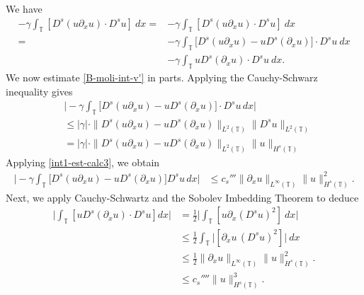\documentclass[12pt,reqno]{amsart}
\newcommand{\p}{\partial}
\newcommand{\ci}{\mathbb{T}}
\theoremstyle{plain}  %
\theoremstyle{definition}
\begin{document}
\begin{appendices}
	We have
	\begin{equation} 
	\begin{split}
		\label{B-moli-int-v'}
		-  \gamma \int_{\ci} \left [D^s (u \p_x u) \cdot D^s
		u \right ] \ dx
		= &- \gamma  \int_\ci
		\left [ D^s(u \partial_x u) \cdot   D^s u \right ] \ dx
		\\
		=& - \gamma \int_\ci
		\big[ 
		D^s(u\p_x u)  -  u D^s (\p_xu)
		\big] \cdot
		D^s u   \ dx
		\\
		&
		- \gamma \int_\ci
		u D^s (\p_xu) \cdot
		D^su \ dx.
	\end{split}
\end{equation}
%
%
%
We now estimate \eqref{B-moli-int-v'} in parts. Applying the Cauchy-Schwarz inequality gives
%
\begin{equation*} 
	\begin{split}
		& \Big|
		- \gamma \int_\ci
		\big[ 
		D^s(u\p_x u)  -  u D^s (\p_xu)
		\big] \cdot
		D^s u   \, dx
		\Big|
		\\
		& \le
		|\gamma| \cdot \|
		D^s(u\p_x u)  -  u D^s (\p_xu)
		\|_{L^2(\ci)}
		\|
		D^s u 
		\|_{L^2(\ci)}
		\\
		& =
		|\gamma| \cdot \| D^s(u\p_x u)  -  u D^s (\p_xu)
		\|_{L^2(\ci)}
		\|
		u
		\|_{H^s(\ci)}
			\end{split}
\end{equation*}
Applying \eqref{int1-est-calc3}, we obtain
\begin{equation*}
\begin{split}
		\Big|
		- \gamma \int_\ci
		\big[ 
		D^s(u\p_x u)  -  u D^s (\p_xu)
		\big]
		D^s u   \, dx
		\Big|
		&\le
		 c_s'''   \| \p_x u \|_{L^\infty(\ci)} 
		\| u \|_{H^s(\ci)}^2.
	\end{split}
\end{equation*}
%
Next, we apply Cauchy-Schwartz and the Sobolev Imbedding Theorem to deduce 
	\begin{equation} 
		\label{int1-est-calc5'}
		\begin{split}
			\Big|
			\int_\ci
			\left [u D^s (\p_x u)
			\cdot  D^s u \right ] dx
			\Big|
			& =
			\frac{1}{2} \Big|
			   \int_\ci
			\left [u \p_x\left(D^s u\right)^2 \right ] \ dx
			\Big|
			\\
			& \le
			\frac{1}{2} \int_\ci \Big |
			\left [\p_x u \, (D^s u)^2  \right ] 
			\Big| \ dx
			\\
			& \le
			\frac{1}{2}
			\| \p_x u \|_{L^\infty(\ci)} 
			\| u \|_{H^s(\ci)}^2.
			\\
			& \le c_s'''' \|u\|_{H^s(\ci)}^3.

\end{split}
\end{equation}
\end{appendices}
\end{document}
